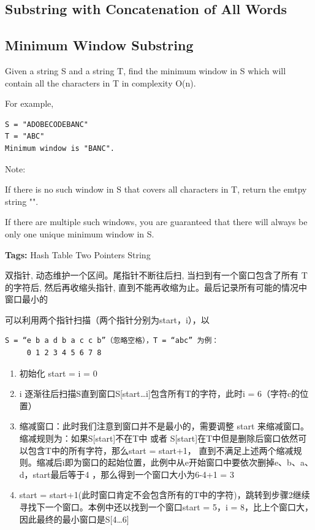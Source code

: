 \documentclass[12pt]{book}
\begin{document}
\subsection{Substring with Concatenation of All Words}
\label{sec-15-3-3}
\subsection{Minimum Window Substring}
\label{sec-15-3-4}
Given a string S and a string T, find the minimum window in S which will contain all the characters in T in complexity O(n).

For example,
\lstset{language=java,label= ,caption= ,numbers=none}
\begin{lstlisting}
S = "ADOBECODEBANC"
T = "ABC"
Minimum window is "BANC".
\end{lstlisting}

Note:

If there is no such window in S that covers all characters in T, return the emtpy string "".

If there are multiple such windows, you are guaranteed that there will always be only one unique minimum window in S.

\textbf{Tags:} Hash Table Two Pointers String

双指针, 动态维护一个区间。尾指针不断往后扫, 当扫到有一个窗口包含了所有 T 的字符后, 
然后再收缩头指针, 直到不能再收缩为止。最后记录所有可能的情况中窗口最小的

可以利用两个指针扫描（两个指针分别为start，i），以
\lstset{language=java,label= ,caption= ,numbers=none}
\begin{lstlisting}
S = “e b a d b a c c b”（忽略空格），T = “abc” 为例：
     0 1 2 3 4 5 6 7 8
\end{lstlisting}

\begin{enumerate}
\item 初始化 start = i = 0

\item i 逐渐往后扫描S直到窗口S[start…i]包含所有T的字符，此时i = 6（字符c的位置）

\item 缩减窗口：此时我们注意到窗口并不是最小的，需要调整 start 来缩减窗口。缩减规则为：如果S[start]不在T中 或者 S[start]在T中但是删除后窗口依然可以包含T中的所有字符，那么start = start+1， 直到不满足上述两个缩减规则。缩减后i即为窗口的起始位置，此例中从e开始窗口中要依次删掉e、b、a、d，start最后等于4 ，那么得到一个窗口大小为6-4+1 = 3

\item start = start+1(此时窗口肯定不会包含所有的T中的字符)，跳转到步骤2继续寻找下一个窗口。本例中还以找到一个窗口start = 5，i = 8，比上个窗口大，因此最终的最小窗口是S[4…6]
\end{enumerate}
\end{document}

